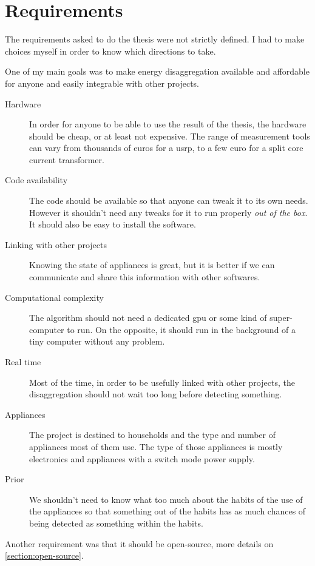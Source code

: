 \chapter{Requirements}\label{section:requirements}
The requirements asked to do the thesis were not strictly defined. I had to make choices myself in order to know which directions to take.

One of my main goals was to make energy disaggregation available and affordable for anyone and easily integrable with other projects.

\begin{description}
\item[Hardware] In order for anyone to be able to use the result of the thesis, the hardware should be cheap, or at least not expensive. The range of measurement tools can vary from thousands of euros for a \acrfull{usrp}, to a few euro for a split core current transformer.
\item[Code availability] The code should be available so that anyone can tweak it to its own needs. However it shouldn't need any tweaks for it to run properly \textit{out of the box}. It should also be easy to install the software.
\item[Linking with other projects] Knowing the state of appliances is great, but it is better if we can communicate and share this information with other softwares.
\item[Computational complexity] The algorithm should not need a dedicated \acrshort{gpu} or some kind of super-computer to run. On the opposite, it should run in the background of a tiny computer without any problem. 
\item[Real time] Most of the time, in order to be usefully linked with other projects, the disaggregation should not wait too long before detecting something.
\item[Appliances] The project is destined to households and the type and number of appliances most of them use. The type of those appliances is mostly electronics and appliances with a switch mode power supply.
\item[Prior] We shouldn't need to know what too much about the habits of the use of the appliances so that something out of the habits has as much chances of being detected as something within the habits.
\end{description}

Another requirement was that it should be open-source, more details on \autoref{section:open-source}.